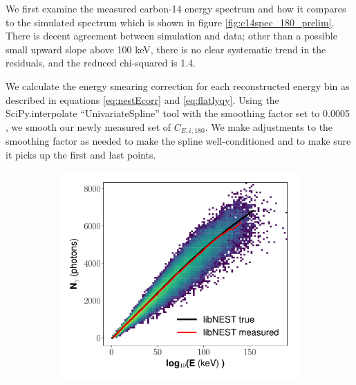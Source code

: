 We first examine the measured carbon-14 energy spectrum and how it compares to the simulated spectrum which is shown in figure \ref{fig:c14spec_180_prelim}. There is decent agreement between simulation and data; other than a possible small upward slope above 100 keV, there is no clear systematic trend in the residuals, and the reduced chi-squared is 1.4.

We calculate the energy smearing correction for each reconstructed energy bin as described in equations \ref{eq:nestEcorr} and \ref{eq:flatlyqy}. Using the SciPy.interpolate ``UnivariateSpline'' tool with the smoothing factor set to 0.0005 \cite{scipy}, we smooth our newly measured set of $C_{E,i,180}$. We make adjustments to the smoothing factor as needed to make the spline well-conditioned and to make sure it picks up the first and last points.
\begin{figure}[h!]
\centering
\begin{subfigure}{0.5\textwidth}
  \centering
  \includegraphics[width=\textwidth]{Figures/yields_corrections/C14_LN_heatmap_gfdcm_180Vcm_prelim.pdf}
  \caption{}
\end{subfigure}%
\begin{subfigure}{0.5\textwidth}
  \centering

\end{subfigure}
\end{figure}

